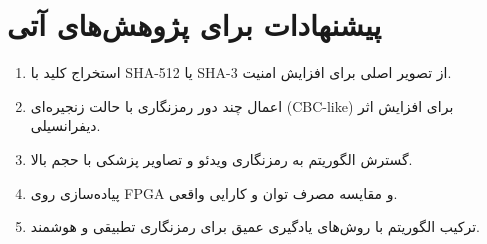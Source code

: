 \documentclass[a4paper,12pt]{report}
\renewcommand{\%}{\lr{\oldpercent}}
\providecommand{\lr}[1]{#1}
\begin{document}
\section{پیشنهادات برای پژوهش‌های آتی}
\begin{enumerate}
    \item استخراج کلید با \lr{SHA-512} یا \lr{SHA-3} از تصویر اصلی برای افزایش امنیت.
    \item اعمال چند دور رمزنگاری با حالت زنجیره‌ای (\lr{CBC-like}) برای افزایش اثر دیفرانسیلی.
    \item گسترش الگوریتم به رمزنگاری ویدئو و تصاویر پزشکی با حجم بالا.
    \item پیاده‌سازی روی \lr{FPGA} و مقایسه مصرف توان و کارایی واقعی.
    \item ترکیب الگوریتم با روش‌های یادگیری عمیق برای رمزنگاری تطبیقی و هوشمند.
\end{enumerate}

\newpage

\end{document}
